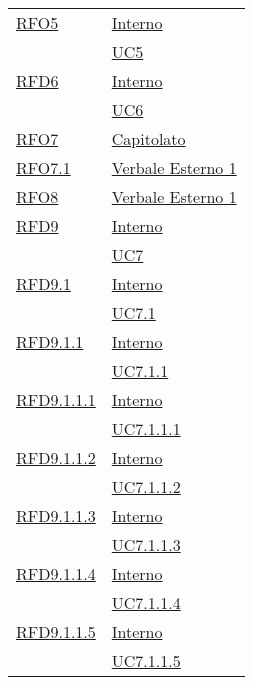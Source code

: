\begin{longtable}{|>{\centering}m{5cm}|m{5cm}<{\centering}|}
\hyperlink{RFO5}{RFO5} & \hyperlink{Interno}{Interno}\\
& \hyperref[UC5]{UC5}\\ \hline

\hyperlink{RFD6}{RFD6} & \hyperlink{Interno}{Interno}\\
& \hyperref[UC6]{UC6}\\ \hline

\hyperlink{RFO7}{RFO7} & \hyperlink{Capitolato}{Capitolato}\\ \hline

\hyperlink{RFO7.1}{RFO7.1} & \hyperlink{Verbale Esterno 1}{Verbale Esterno 1}\\ \hline

\hyperlink{RFO8}{RFO8} & \hyperlink{Verbale Esterno 1}{Verbale Esterno 1}\\ \hline

\hyperlink{RFD9}{RFD9} & \hyperlink{Interno}{Interno}\\
& \hyperref[UC7]{UC7}\\ \hline

\hyperlink{RFD9.1}{RFD9.1} & \hyperlink{Interno}{Interno}\\
& \hyperref[UC7.1]{UC7.1}\\ \hline

\hyperlink{RFD9.1.1}{RFD9.1.1} & \hyperlink{Interno}{Interno}\\
& \hyperref[UC7.1.1]{UC7.1.1}\\ \hline

\hyperlink{RFD9.1.1.1}{RFD9.1.1.1} & \hyperlink{Interno}{Interno}\\
& \hyperref[UC7.1.1.1]{UC7.1.1.1}\\ \hline

\hyperlink{RFD9.1.1.2}{RFD9.1.1.2} & \hyperlink{Interno}{Interno}\\
& \hyperref[UC7.1.1.2]{UC7.1.1.2}\\ \hline

\hyperlink{RFD9.1.1.3}{RFD9.1.1.3} & \hyperlink{Interno}{Interno}\\
& \hyperref[UC7.1.1.3]{UC7.1.1.3}\\ \hline

\hyperlink{RFD9.1.1.4}{RFD9.1.1.4} & \hyperlink{Interno}{Interno}\\
& \hyperref[UC7.1.1.4]{UC7.1.1.4}\\ \hline

\hyperlink{RFD9.1.1.5}{RFD9.1.1.5} & \hyperlink{Interno}{Interno}\\
& \hyperref[UC7.1.1.5]{UC7.1.1.5}\\ \hline


\end{longtable}
